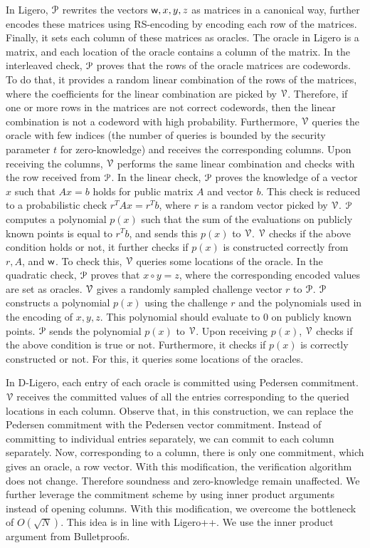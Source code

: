 In Ligero, $\mathcal{P}$ rewrites the vectors $\mathsf{w}, x, y, z$ as matrices in a canonical way, further encodes these matrices using RS-encoding by encoding each row of the matrices. Finally, it sets each column of these matrices as oracles. The oracle in Ligero is a matrix, and each location of the oracle contains a column of the matrix.
In the interleaved check, $\mathcal{P}$ proves that the rows of the oracle matrices are codewords. To do that, it provides a random linear combination of the rows of the matrices, where the coefficients for the linear combination are picked by $\mathcal{V}$. Therefore, if one or more rows in the matrices are not correct codewords, then the linear combination is not a codeword with high probability. Furthermore, $\mathcal{V}$ queries the oracle with few indices (the number of queries is bounded by the security parameter $t$ for zero-knowledge) and receives the corresponding columns. Upon receiving the columns, $\mathcal{V}$ performs the same linear combination and checks with the row received from $\mathcal{P}$.
In the linear check, $\mathcal{P}$ proves the knowledge of a vector $x$ such that $Ax = b$ holds for public matrix $A$ and vector $b$. This check is reduced to a probabilistic check $r^TAx = r^T b$, where $r$ is a random vector picked by $\mathcal{V}$. $\mathcal{P}$ computes a polynomial $p(x)$ such that the sum of the evaluations on publicly known points is equal to $r^Tb$, and sends this $p(x)$ to $\mathcal{V}$. $\mathcal{V}$ checks if the above condition holds or not, it further checks if $p(x)$ is constructed correctly from $r, A$, and $\mathsf{w}$. To check this, $\mathcal{V}$ queries some locations of the oracle.
In the quadratic check, $\mathcal{P}$ proves that $x \circ y = z$, where the corresponding encoded values are set as oracles. $\mathcal{V}$ gives a randomly sampled challenge vector $r$ to $\mathcal{P}$. $\mathcal{P}$ constructs a polynomial $p(x)$ using the challenge $r$ and the polynomials used in the encoding of $x, y, z$. This polynomial should evaluate to $0$ on publicly known points. $\mathcal{P}$ sends the polynomial $p(x)$ to $\mathcal{V}$. Upon receiving $p(x)$, $\mathcal{V}$ checks if the above condition is true or not. Furthermore, it checks if $p(x)$ is correctly constructed or not. For this, it queries some locations of the oracles.

In D-Ligero, each entry of each oracle is committed using Pedersen commitment. $\mathcal{V}$ receives the committed values of all the entries corresponding to the queried locations in each column.
Observe that, in this construction, we can replace the Pedersen commitment with the Pedersen vector commitment. Instead of committing to individual entries separately, we can commit to each column separately. Now, corresponding to a column, there is only one commitment, which gives an oracle, a row vector. With this modification, the verification algorithm does not change. Therefore soundness and zero-knowledge remain unaffected.
We further leverage the commitment scheme by using inner product arguments instead of opening columns. With this modification, we overcome the bottleneck of $O(\sqrt{N})$. This idea is in line with Ligero++. We use the inner product argument from Bulletproofs.

